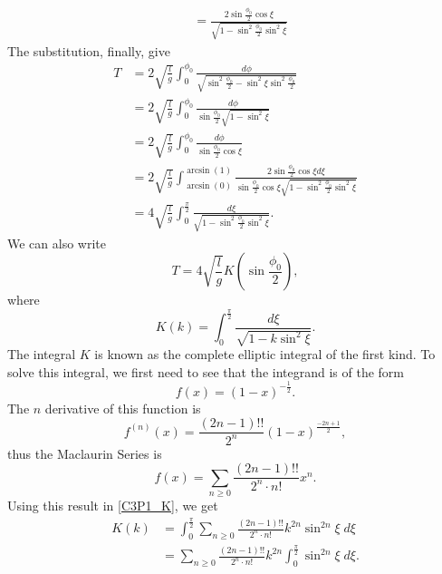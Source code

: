 \begin{problem}
{\begin{align*}
    &= \frac{2\sin{\frac{\phi_0}{2}}\cos{\xi}}{\sqrt{1-\sin^2{\frac{\phi_0}{2}}\sin^2{\xi}}}
\end{align*}
The substitution, finally, give
\begin{align*}
    T &= 2\sqrt{\frac{l}{g}} \int_{0}^{\phi_0} \frac{d\phi}{\sqrt{\sin^2{\frac{\phi_0}{2}} - \sin^2{\xi}\sin^2{\frac{\phi_0}{2}}}} \\
    &= 2\sqrt{\frac{l}{g}} \int_{0}^{\phi_0} \frac{d\phi}{\sin{\frac{\phi_0}{2}}\sqrt{ 1 - \sin^2{\xi}}} \\
    &= 2\sqrt{\frac{l}{g}} \int_{0}^{\phi_0} \frac{d\phi}{\sin{\frac{\phi_0}{2}}\cos{\xi}} \\
    &= 2\sqrt{\frac{l}{g}} \int_{\arcsin{(0)}}^{\arcsin{(1)}} \frac{2\sin{\frac{\phi_0}{2}}\cos{\xi} d\xi}{\sin{\frac{\phi_0}{2}}\cos{\xi}\sqrt{1-\sin^2{\frac{\phi_0}{2}}\sin^2{\xi}}} \\
    &= 4\sqrt{\frac{l}{g}} \int_{0}^{\frac{\pi}{2}} \frac{d\xi}{\sqrt{1-\sin^2{\frac{\phi_0}{2}}\sin^2{\xi}}}.
\end{align*}
We can also write
\begin{equation*}
    T = 4\sqrt{\frac{l}{g}} K\left(\sin{\frac{\phi_0}{2}}\right),
\end{equation*}
where 
\begin{equation} \label{C3P1_K}
    K(k) = \int_{0}^{\frac{\pi}{2}} \frac{d\xi}{\sqrt{1-k\sin^2{\xi}}}.
\end{equation}
The integral $K$ is known as the complete elliptic integral of the first kind. To solve this integral, we first need to see that the integrand is of the form 
\begin{equation*}
    f(x) = \left( 1 - x \right)^{-\frac{1}{2}}.
\end{equation*}
The $n$ derivative of this function is
\begin{equation*}
    f^{(n)}(x) = \frac{\left( 2n-1 \right)!!}{2^n}\left( 1-x \right)^{\frac{-2n+1}{2}},
\end{equation*}
thus the Maclaurin Series is
\begin{equation*}
    f(x) = \sum_{n\geq0}\frac{(2n-1)!!}{2^n \cdot n!}x^n.
\end{equation*}
Using this result in \eqref{C3P1_K}, we get
\begin{align*}
    K(k) &= \int_{0}^{\frac{\pi}{2}} \sum_{n\geq0}\frac{(2n-1)!!}{2^n \cdot n!}k^{2n}\sin^{2n}{\xi}\;d\xi \\
    &= \sum_{n\geq0}\frac{(2n-1)!!}{2^n \cdot n!}k^{2n} \int_{0}^{\frac{\pi}{2}} \sin^{2n}{\xi}\;d\xi.
\end{align*}
}
\end{problem}
